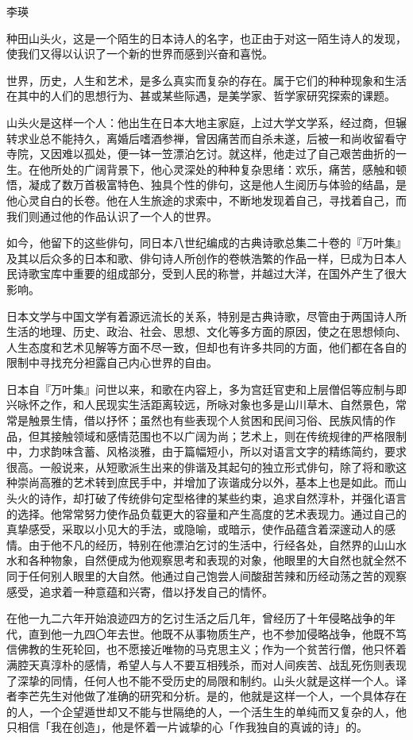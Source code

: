 {\FS \hfill 李瑛

    种田山头火，这是一个陌生的日本诗人的名字，也正由于对这一陌生诗人的发现，使我们又得以认识了一个新的世界而感到兴奋和喜悦。

    世界，历史，人生和艺术，是多么真实而复杂的存在。属于它们的种种现象和生活在其中的人们的思想行为、甚或某些际遇，是美学家、哲学家研究探索的课题。

    山头火是这样一个人：他出生在日本大地主家庭，上过大学文学系，经过商，但辗转求业总不能持久，离婚后嗜酒参禅，曾因痛苦而自杀未遂，后被一和尚收留看守寺院，又因难以孤处，便一钵一笠漂泊乞讨。就这样，他走过了自己艰苦曲折的一生。在他所处的广阔背景下，他心灵深处的种种复杂思绪：欢乐，痛苦，感触和顿悟，凝成了数万首极富特色、独具个性的俳句，这是他人生阅历与体验的结晶，是他心灵自白的长卷。他在人生旅途的求索中，不断地发现着自己，寻找着自己，而我们则通过他的作品认识了一个人的世界。

    如今，他留下的这些俳句，同日本八世纪编成的古典诗歌总集二十卷的『万叶集』及其以后众多的日本和歌、俳句诗人所创作的卷帙浩繁的作品一样，巳成为日本人民诗歌宝库中重要的组成部分，受到人民的称誉，并越过大洋，在国外产生了很大影响。

    日本文学与中国文学有着源远流长的关系，特别是古典诗歌，尽管由于两国诗人所生活的地理、历史、政治、社会、思想、文化等多方面的原因，使之在思想倾向、人生态度和艺术见解等方面不尽一致，但却也有许多共同的方面，他们都在各自的限制中寻找充分袒露自己内心世界的自由。

    日本自『万叶集』问世以来，和歌在内容上，多为宫廷官吏和上层僧侣等应制与即兴咏怀之作，和人民现实生活距离较远，所咏对象也多是山川草木、自然景色，常常是触景生情，借以抒怀；虽然也有些表现个人贫困和民间习俗、民族风情的作品，但其接触领域和感情范围也不以广阔为尚；艺术上，则在传统规律的严格限制中，力求韵味含蓄、风格淡雅，由于篇幅短小，所以对语言文字的精练简约，要求很高。一般说来，从短歌派生出来的俳谐及其起句的独立形式俳句，除了将和歌这种崇尚高雅的艺术转到庶民手中，并增加了诙谐成分以外，基本上也是如此。而山头火的诗作，却打破了传统俳句定型格律的某些约束，追求自然淳朴，并强化语言的选择。他常常努力使作品负载更大的容量和产生高度的艺术表现力。通过自己的真挚感受，采取以小见大的手法，或隐喻，或暗示，使作品蕴含着深邃动人的感情。由于他不凡的经历，特别在他漂泊乞讨的生活中，行经各处，自然界的山山水水和各种物象，自然便成为他观察思考和表现的对象，他眼里的大自然也就全然不同于任何别人眼里的大自然。他通过自己饱尝人间酸甜苦辣和历经动荡之苦的观察感受，追求着一种意蕴和兴寄，借以抒发自己的情怀。

    在他一九二六年开始浪迹四方的乞讨生活之后几年，曾经历了十年侵略战争的年代，直到他一九四〇年去世。他既不从事物质生产，也不参加侵略战争，他既不笃信佛教的生死轮回，也不愿接近唯物的马克思主义；作为一个贫苦行僧，他只怀着满腔天真淳朴的感情，希望人与人不要互相残杀，而对人间疾苦、战乱死伤则表现了深挚的同情，任何人也不能不受历史的局限和制约。山头火就是这样一个人。译者李芒先生对他做了准确的研究和分析。是的，他就是这样一个人，一个具体存在的人，一个企望遁世却又不能与世隔绝的人，一个活生生的单纯而又复杂的人，他只相信「我在创造」，他是怀着一片诚挚的心「作我独自的真诚的诗」的。

}
